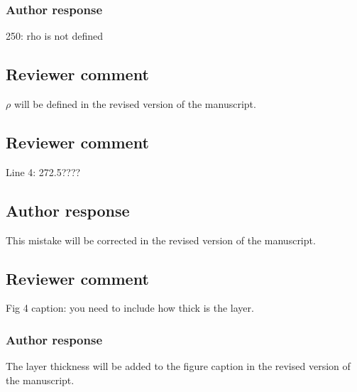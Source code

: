 \documentclass[11pt]{scrartcl}
\begin{document}
%

\subsubsection*{Author response}
250: rho is not defined

\subsection*{Reviewer comment}

$\rho$ will be defined in the revised version of the manuscript.


\subsection*{Reviewer comment}
Line 4: 272.5????

\subsection*{Author response}
This mistake will be corrected in the revised version of the manuscript.

\subsection*{Reviewer comment}
Fig 4 caption: you need to include how thick is the layer.

\subsubsection*{Author response}
The layer thickness will be added to the figure caption in the revised version
of the manuscript.



\end{document}
